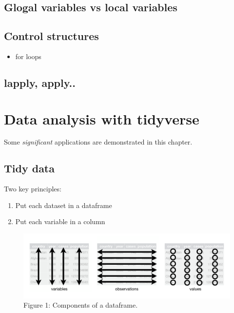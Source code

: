 \documentclass[]{book}
\providecommand{\tightlist}{%
  \setlength{\itemsep}{0pt}\setlength{\parskip}{0pt}}
\begin{document}
\hypertarget{glogal-variables-vs-local-variables}{%
\section{Glogal variables vs local variables}\label{glogal-variables-vs-local-variables}}

\hypertarget{control-structures}{%
\section{Control structures}\label{control-structures}}

\begin{itemize}
\tightlist
\item
  for loops
\end{itemize}

\hypertarget{lapply-apply..}{%
\section{lapply, apply..}\label{lapply-apply..}}

\hypertarget{data-analysis-with-tidyverse}{%
\chapter{Data analysis with tidyverse}\label{data-analysis-with-tidyverse}}

Some \emph{significant} applications are demonstrated in this chapter.

\hypertarget{tidy-data}{%
\section{Tidy data}\label{tidy-data}}

Two key principles:

\begin{enumerate}
\def\labelenumi{\arabic{enumi}.}
\item
  Put each dataset in a dataframe
\item
  Put each variable in a column
\end{enumerate}

\begin{figure}
\centering
\includegraphics{tidy-1.png}
\caption{Figure 1: Components of a dataframe.}
\end{figure}
\end{document}
